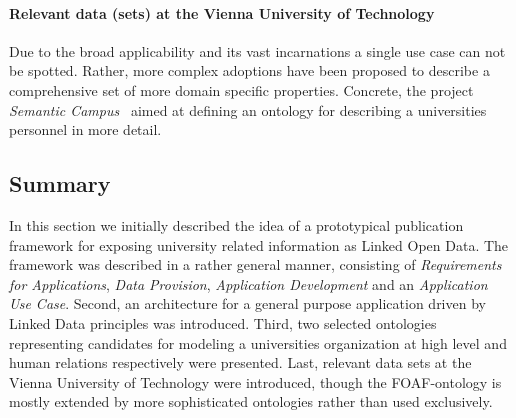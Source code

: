 \documentclass{article}
\begin{document}
\paragraph{Relevant data (sets) at the Vienna University of Technology}
Due to the broad applicability and its vast incarnations a single use case can not be spotted. Rather, more complex adoptions have been proposed to describe a comprehensive set of more domain specific properties. Concrete, the project \textit{Semantic Campus}~\cite{inproceedings:semantic-campus} aimed at defining an ontology for describing a universities personnel in more detail. 
\subsection{Summary}
In this section we initially described the idea of a prototypical publication framework for exposing university related information as Linked Open Data. The framework was described in a rather general manner, consisting of \textit{Requirements for Applications}, \textit{Data Provision}, \textit{Application Development} and an \textit{Application Use Case}. Second, an architecture for a general purpose application driven by Linked Data principles was introduced. Third, two selected ontologies representing candidates for modeling a universities organization at high level and human relations respectively were presented.
Last, relevant data sets at the Vienna University of Technology were introduced, though the FOAF-ontology is mostly extended by more sophisticated ontologies rather than used exclusively. 
\end{document}
